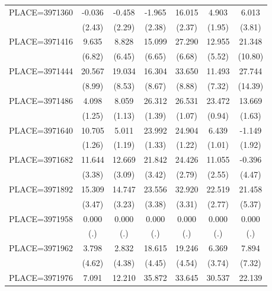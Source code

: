 {\begin{tabular}{l*{6}{c}}
PLACE=3971360       &      -0.036&      -0.458&      -1.965&      16.015&       4.903&       6.013\\
                    &      (2.43)&      (2.29)&      (2.38)&      (2.37)&      (1.95)&      (3.81)\\
PLACE=3971416       &       9.635&       8.828&      15.099&      27.290&      12.955&      21.348\\
                    &      (6.82)&      (6.45)&      (6.65)&      (6.68)&      (5.52)&     (10.80)\\
PLACE=3971444       &      20.567&      19.034&      16.304&      33.650&      11.493&      27.744\\
                    &      (8.99)&      (8.53)&      (8.67)&      (8.88)&      (7.32)&     (14.39)\\
PLACE=3971486       &       4.098&       8.059&      26.312&      26.531&      23.472&      13.669\\
                    &      (1.25)&      (1.13)&      (1.39)&      (1.07)&      (0.94)&      (1.63)\\
PLACE=3971640       &      10.705&       5.011&      23.992&      24.904&       6.439&      -1.149\\
                    &      (1.26)&      (1.19)&      (1.33)&      (1.22)&      (1.01)&      (1.92)\\
PLACE=3971682       &      11.644&      12.669&      21.842&      24.426&      11.055&      -0.396\\
                    &      (3.38)&      (3.09)&      (3.42)&      (2.79)&      (2.55)&      (4.47)\\
PLACE=3971892       &      15.309&      14.747&      23.556&      32.920&      22.519&      21.458\\
                    &      (3.47)&      (3.23)&      (3.38)&      (3.31)&      (2.77)&      (5.37)\\
PLACE=3971958       &       0.000&       0.000&       0.000&       0.000&       0.000&       0.000\\
                    &         (.)&         (.)&         (.)&         (.)&         (.)&         (.)\\
PLACE=3971962       &       3.798&       2.832&      18.615&      19.246&       6.369&       7.894\\
                    &      (4.62)&      (4.38)&      (4.45)&      (4.54)&      (3.74)&      (7.32)\\
PLACE=3971976       &       7.091&      12.210&      35.872&      33.645&      30.537&      22.139\\

\end{tabular}}
